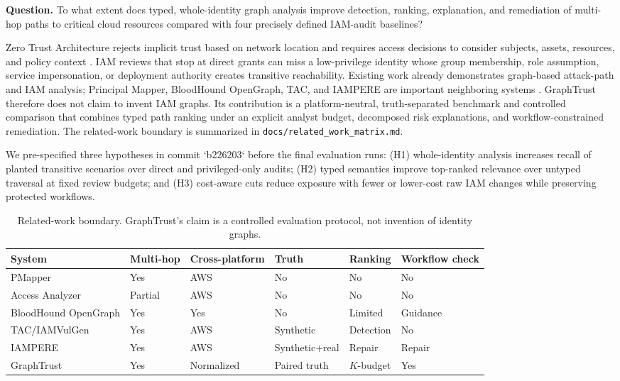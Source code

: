 \documentclass[10pt]{article}
\begin{document}
\textbf{Question.} To what extent does typed, whole-identity graph analysis improve detection, ranking, explanation, and remediation of multi-hop paths to critical cloud resources compared with four precisely defined IAM-audit baselines?

Zero Trust Architecture rejects implicit trust based on network location and requires access decisions to consider subjects, assets, resources, and policy context \citep{nist2020,nist2023}. IAM reviews that stop at direct grants can miss a low-privilege identity whose group membership, role assumption, service impersonation, or deployment authority creates transitive reachability. Existing work already demonstrates graph-based attack-path and IAM analysis; Principal Mapper, BloodHound OpenGraph, TAC, and IAMPERE are important neighboring systems \citep{pmapper,bloodhound,tac,iampere}. GraphTrust therefore does not claim to invent IAM graphs. Its contribution is a platform-neutral, truth-separated benchmark and controlled comparison that combines typed path ranking under an explicit analyst budget, decomposed risk explanations, and workflow-constrained remediation. The related-work boundary is summarized in \texttt{docs/related\_work\_matrix.md}.

We pre-specified three hypotheses in commit `b226203` before the final evaluation runs: (H1) whole-identity analysis increases recall of planted transitive scenarios over direct and privileged-only audits; (H2) typed semantics improve top-ranked relevance over untyped traversal at fixed review budgets; and (H3) cost-aware cuts reduce exposure with fewer or lower-cost raw IAM changes while preserving protected workflows.

\begin{table}[H]
\centering
\caption{Related-work boundary. GraphTrust's claim is a controlled evaluation protocol, not invention of identity graphs.}
\small
\begin{tabularx}{\linewidth}{lXXXXX}
\toprule
System & Multi-hop & Cross-platform & Truth & Ranking & Workflow check\\
\midrule
PMapper & Yes & AWS & No & No & No\\
Access Analyzer & Partial & AWS & No & No & No\\
BloodHound OpenGraph & Yes & Yes & No & Limited & Guidance\\
TAC/IAMVulGen & Yes & AWS & Synthetic & Detection & No\\
IAMPERE & Yes & AWS & Synthetic+real & Repair & Repair\\
GraphTrust & Yes & Normalized & Paired truth & $K$-budget & Yes\\
\bottomrule
\end{tabularx}
\end{table}
\end{document}
